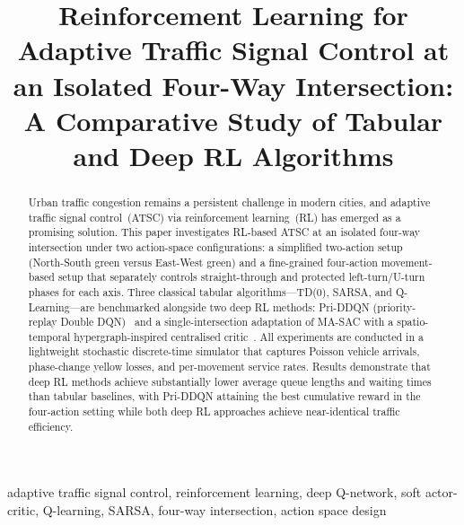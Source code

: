 \documentclass[conference]{IEEEtran}
\begin{document}
\title{Reinforcement Learning for Adaptive Traffic Signal Control
at an Isolated Four-Way Intersection:\\
A Comparative Study of Tabular and Deep RL Algorithms}

\author{%
\IEEEauthorblockN{[Authors]}
}

\maketitle

\begin{abstract}
Urban traffic congestion remains a persistent challenge in modern
cities, and adaptive traffic signal control~(ATSC) via reinforcement
learning~(RL) has emerged as a promising solution. This paper
investigates RL-based ATSC at an isolated four-way intersection
under two action-space configurations: a simplified two-action setup
(North-South green versus East-West green) and a fine-grained
four-action movement-based setup that separately controls
straight-through and protected left-turn/U-turn phases for each
axis. Three classical tabular algorithms---TD(0), SARSA, and
Q-Learning---are benchmarked alongside two deep RL methods:
Pri-DDQN (priority-replay Double DQN)~\cite{Zheng2024PriDDQNLAG}
and a single-intersection adaptation of MA-SAC with a
spatio-temporal hypergraph-inspired centralised
critic~\cite{Wang2024TowardMRP}. All experiments are conducted in a
lightweight stochastic discrete-time simulator that captures Poisson
vehicle arrivals, phase-change yellow losses, and per-movement
service rates. Results demonstrate that deep RL methods achieve
substantially lower average queue lengths and waiting times than
tabular baselines, with Pri-DDQN attaining the best cumulative
reward in the four-action setting while both deep RL approaches
achieve near-identical traffic efficiency.
\end{abstract}

\begin{IEEEkeywords}
adaptive traffic signal control, reinforcement learning,
deep Q-network, soft actor-critic, Q-learning, SARSA,
four-way intersection, action space design
\end{IEEEkeywords}
\end{document}
